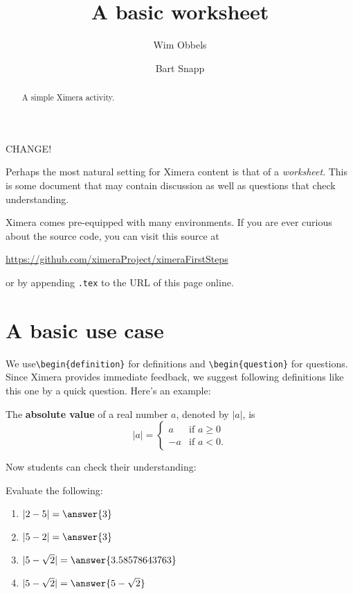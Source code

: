 \documentclass{ximera}
\title{A basic worksheet}
\author{Wim Obbels \and Bart Snapp}
\begin{document}
\begin{abstract}
    A simple Ximera activity.
\end{abstract}
\maketitle
\label{xim:aFirstActivity}

CHANGE!

Perhaps the most natural setting for Ximera content is that of a
\textit{worksheet}. This is some document that may contain discussion as well
as questions that check understanding.

Ximera comes pre-equipped with many environments.  If you are ever curious about
the source code, you can visit this source at

\begin{center}
    \url{https://github.com/ximeraProject/ximeraFirstSteps}
\end{center}
or by appending \verb|.tex| to the URL of this page online. 


\section{A basic use case}
We use\verb|\begin{definition}| for definitions and \verb|\begin{question}| for
questions. Since Ximera provides immediate feedback, we suggest following
definitions like this one by a quick question. Here's an example:

\begin{definition}\label{def:absolute_value}
    The \textbf{absolute value} of a real number $a$, denoted by $|a|$, is
    \[
        |a| = \begin{cases}
            a  & \text{if $a \geq 0$} \\
            -a & \text{if $a<0$.}
        \end{cases}
    \]
\end{definition}
Now students can check their understanding:
\begin{question}
    Evaluate the following:
    \begin{enumerate}
        \item $|2-5| = \answer{3}$
        \item $|5-2| = \answer{3}$
        \item $|5-\sqrt{2}| = \answer{3.58578643763}$
        \item $|5-\sqrt{2}| = \answer{5-\sqrt{2}}$
    \end{enumerate}
\end{question}
\end{document}

